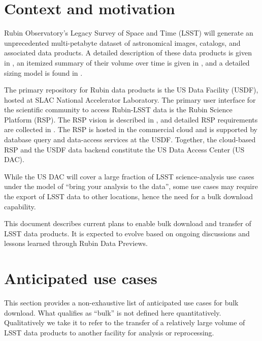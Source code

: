 \section{Context and motivation}

Rubin Observatory's Legacy Survey of Space and Time (LSST) will generate an unprecedented multi-petabyte dataset of astronomical images, catalogs, and associated data products. A detailed description of these data products is given in , an itemized summary of their volume over time is given in , and a detailed sizing model is found in .

The primary repository for Rubin data products is the US Data Facility (USDF), hosted at SLAC National Accelerator Laboratory. The primary user interface for the scientific community to access Rubin-LSST data is the Rubin Science Platform (RSP). The RSP vision is described in , and detailed RSP requirements are collected in . The RSP is hosted in the commercial cloud and is supported by database query and data-access services at the USDF. Together, the cloud-based RSP and the USDF data backend constitute the US Data Access Center (US DAC).

While the US DAC will cover a large fraction of LSST science-analysis use cases under the model of ``bring your analysis to the data'', some use cases may require the export of LSST data to other locations, hence the need for a bulk download capability.

This document describes current plans to enable bulk download and transfer of LSST data products. It is expected to evolve based on ongoing discussions and lessons learned through Rubin Data Previews.

\section{Anticipated use cases}

This section provides a non-exhaustive list of anticipated use cases for bulk download. What qualifies as ``bulk'' is not defined here quantitatively. Qualitatively we take it to refer to the transfer of a relatively large volume of LSST data products to another facility for analysis or reprocessing.

